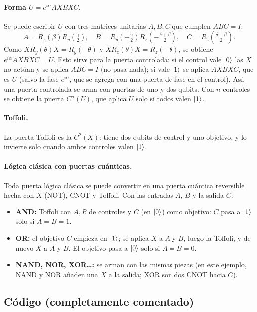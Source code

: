 \paragraph{Forma $U=e^{i\alpha}AXBXC$.} Se puede escribir $U$ con tres matrices
unitarias $A,B,C$ que cumplen $ABC=I$:
\begin{equation}
  A=R_z(\beta)R_y(\tfrac\gamma2),\quad
  B=R_y(-\tfrac\gamma2)R_z(-\tfrac{\delta+\beta}2),\quad
  C=R_z(\tfrac{\delta-\beta}2).
\end{equation}
Como $XR_y(\theta)X=R_y(-\theta)$ y $XR_z(\theta)X=R_z(-\theta)$, se obtiene
$e^{i\alpha}AXBXC=U$. Esto sirve para la puerta controlada: si el control vale
$\left|0\right\rangle$ las $X$ no actúan y se aplica $ABC=I$ (no pasa nada); si vale
$\left|1\right\rangle$ se aplica $AXBXC$, que es $U$ (salvo la fase $e^{i\alpha}$, que se
agrega con una puerta de fase en el control). Así, una puerta controlada
se arma con puertas de uno y dos qubits. Con $n$ controles se obtiene la puerta
$C^n(U)$, que aplica $U$ solo si todos valen $\left|1\right\rangle$.

\paragraph{Toffoli.} La puerta Toffoli es la $C^2(X)$: tiene dos qubits de control
y uno objetivo, y lo invierte solo cuando ambos controles valen $\left|1\right\rangle$.

\paragraph{Lógica clásica con puertas cuánticas.} Toda puerta lógica clásica se
puede convertir en una puerta cuántica reversible hecha con $X$ (NOT), CNOT
y Toffoli. Con las entradas $A$, $B$ y la salida $C$:
\begin{itemize}
  \item \textbf{AND:} Toffoli con $A,B$ de controles y $C$ (en $\left|0\right\rangle$) como
    objetivo: $C$ pasa a $\left|1\right\rangle$ solo si $A=B=1$.
  \item \textbf{OR:} el objetivo $C$ empieza en $\left|1\right\rangle$; se aplica $X$ a $A$
    y $B$, luego la Toffoli, y de nuevo $X$ a $A$ y $B$. El objetivo pasa a
    $\left|0\right\rangle$ solo si $A=B=0$.
  \item \textbf{NAND, NOR, XOR\ldots:} se arman con las mismas piezas (en este
    ejemplo, NAND y NOR añaden una $X$ a la salida; XOR son dos CNOT hacia $C$).
\end{itemize}

\subsection{Código (completamente comentado)}


